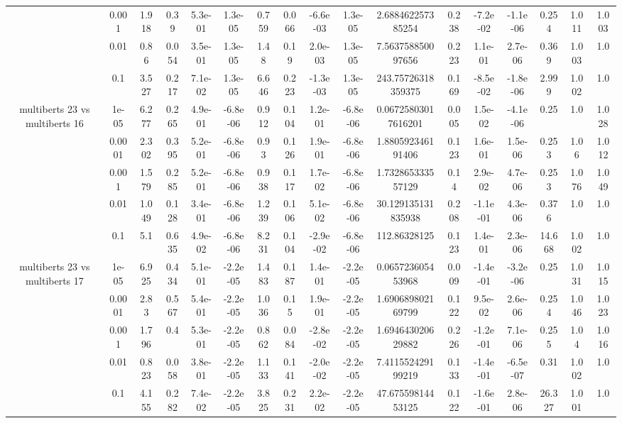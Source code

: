 \begin{tabular}{|c|c|c|c|c|c|c|c|c|c|c|c|c|c|c|c|c|}
 & 0.001 & 1.918 & 0.39 & 5.3e-01 & 1.3e-05 & 0.759 & 0.066 & -6.6e-03 & 1.3e-05 & 2.688462257385254 & 0.238 & -7.2e-02 & -1.1e-06 & 0.254 & 1.011 & 1.003 \\
 & 0.01 & 0.86 & 0.054 & 3.5e-01 & 1.3e-05 & 1.48 & 0.19 & 2.0e-03 & 1.3e-05 & 7.563758850097656 & 0.223 & 1.1e-01 & 2.7e-06 & 0.369 & 1.003 & 1.0 \\
 & 0.1 & 3.527 & 0.217 & 7.1e-02 & 1.3e-05 & 6.646 & 0.223 & -1.3e-03 & 1.3e-05 & 243.75726318359375 & 0.169 & -8.5e-02 & -1.8e-06 & 2.999 & 1.002 & 1.0 \\
\hline
\multirow{5}{*}{multiberts 23 vs multiberts 16} & 1e-05 & 6.277 & 0.265 & 4.9e-01 & -6.8e-06 & 0.912 & 0.104 & 1.2e-01 & -6.8e-06 & 0.06725803017616201 & 0.005 & 1.5e-02 & -4.1e-06 & 0.25 & 1.0 & 1.028 \\
 & 0.0001 & 2.302 & 0.395 & 5.2e-01 & -6.8e-06 & 0.93 & 0.126 & 1.9e-01 & -6.8e-06 & 1.880592346191406 & 0.123 & 1.6e-01 & 1.5e-06 & 0.253 & 1.06 & 1.012 \\
 & 0.001 & 1.579 & 0.285 & 5.2e-01 & -6.8e-06 & 0.938 & 0.117 & 1.7e-02 & -6.8e-06 & 1.732865333557129 & 0.14 & 2.9e-02 & 4.7e-06 & 0.253 & 1.076 & 1.049 \\
 & 0.01 & 1.049 & 0.128 & 3.4e-01 & -6.8e-06 & 1.239 & 0.106 & 5.1e-02 & -6.8e-06 & 30.129135131835938 & 0.208 & -1.1e-01 & 4.3e-06 & 0.376 & 1.0 & 1.0 \\
 & 0.1 & 5.1 & 0.635 & 4.9e-02 & -6.8e-06 & 8.231 & 0.104 & -2.9e-02 & -6.8e-06 & 112.86328125 & 0.123 & 1.4e-01 & 2.3e-06 & 14.668 & 1.002 & 1.0 \\
\hline
\multirow{5}{*}{multiberts 23 vs multiberts 17} & 1e-05 & 6.925 & 0.434 & 5.1e-01 & -2.2e-05 & 1.483 & 0.187 & 1.4e-01 & -2.2e-05 & 0.065723605453968 & 0.009 & -1.4e-01 & -3.2e-06 & 0.25 & 1.031 & 1.015 \\
 & 0.0001 & 2.83 & 0.567 & 5.4e-01 & -2.2e-05 & 1.036 & 0.15 & 1.9e-01 & -2.2e-05 & 1.690689802169799 & 0.122 & 9.5e-02 & 2.6e-06 & 0.254 & 1.046 & 1.023 \\
 & 0.001 & 1.796 & 0.4 & 5.3e-01 & -2.2e-05 & 0.862 & 0.084 & -2.8e-02 & -2.2e-05 & 1.694643020629882 & 0.226 & -1.2e-01 & 7.1e-06 & 0.255 & 1.04 & 1.016 \\
 & 0.01 & 0.823 & 0.058 & 3.8e-01 & -2.2e-05 & 1.133 & 0.141 & -2.0e-02 & -2.2e-05 & 7.411552429199219 & 0.133 & -1.4e-01 & -6.5e-07 & 0.31 & 1.002 & 1.0 \\
 & 0.1 & 4.155 & 0.282 & 7.4e-02 & -2.2e-05 & 3.825 & 0.231 & 2.2e-02 & -2.2e-05 & 47.67559814453125 & 0.122 & -1.6e-01 & 2.8e-06 & 26.327 & 1.001 & 1.0 \\

\end{tabular}
